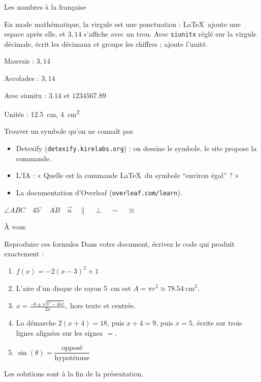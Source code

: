 \begin{frame}[fragile]{Les nombres à la française}
  \begin{AuTableau}
    \footnotesize En mode mathématique, la virgule est une ponctuation :
    \LaTeX\ ajoute une espace après elle, et $3,14$ s'affiche avec un trou.
    Avec \texttt{siunitx} réglé sur la virgule décimale,  écrit
    les décimaux et groupe les chiffres ;  ajoute l'unité.
  \end{AuTableau}
\begin{CodeRendu}[title={Trois solutions}]
Mauvais : $3,14$

Accolades : $3{,}14$

Avec siunitx : $\num{3,14}$
et $\num{1234567,89}$

Unités : \qty{12,5}{\centi\metre},
\qty{4}{\centi\metre\squared}
\end{CodeRendu}
\end{frame}

\begin{frame}[fragile]{Trouver un symbole qu'on ne connaît pas}
  \small
  \begin{itemize}
    \item Detexify (\texttt{detexify.kirelabs.org}) : on dessine le
      symbole, le site propose la commande.
    \item L'IA : « Quelle est la commande \LaTeX\ du symbole “environ
      égal” ? »
    \item La documentation d'Overleaf (\texttt{overleaf.com/learn}).
  \end{itemize}
\begin{CodeRendu}[title={Quelques symboles utiles en géométrie}]
$\angle ABC \quad 45^\circ \quad \overline{AB}
 \quad \vec{u} \quad \parallel \quad \perp
 \quad \sim \quad \cong$
\end{CodeRendu}
\end{frame}

\begin{frame}{À vous}
  \begin{Exercice}{Reproduire ces formules}
    \small Dans votre document, écrivez le code qui produit exactement :
    \begin{enumerate}
      \item $f(x) = -2(x - 3)^2 + 1$
      \item L'aire d'un disque de rayon \qty{5}{\centi\metre} est
        $A = \pi r^2 \approx \qty{78,54}{\centi\metre\squared}$.
      \item \( \displaystyle x = \frac{-b \pm \sqrt{b^2 - 4ac}}{2a} \),
        hors texte et centrée.
      \item La démarche $2(x + 4) = 18$, puis $x + 4 = 9$, puis $x = 5$,
        écrite sur trois lignes alignées sur les signes $=$.
      \item $\sin(\theta) = \dfrac{\text{opposé}}{\text{hypoténuse}}$
    \end{enumerate}
    Les solutions sont à la fin de la présentation.
  \end{Exercice}
\end{frame}
